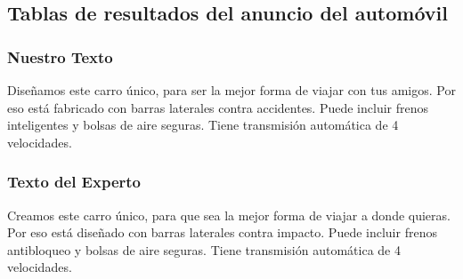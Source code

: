 \subsection{Tablas de resultados del anuncio del automóvil}


\subsubsection{Nuestro Texto}

Diseñamos este carro único, para ser la mejor forma de viajar con tus amigos. Por eso está fabricado con barras laterales contra accidentes. Puede incluir frenos inteligentes y bolsas de aire seguras. Tiene transmisión automática de 4 velocidades.

\subsubsection{Texto del Experto}

Creamos este carro único, para que sea la mejor forma de viajar a donde quieras. Por eso está diseñado con barras laterales contra impacto. Puede incluir frenos antibloqueo y bolsas de aire seguras. Tiene transmisión automática de 4 velocidades.

